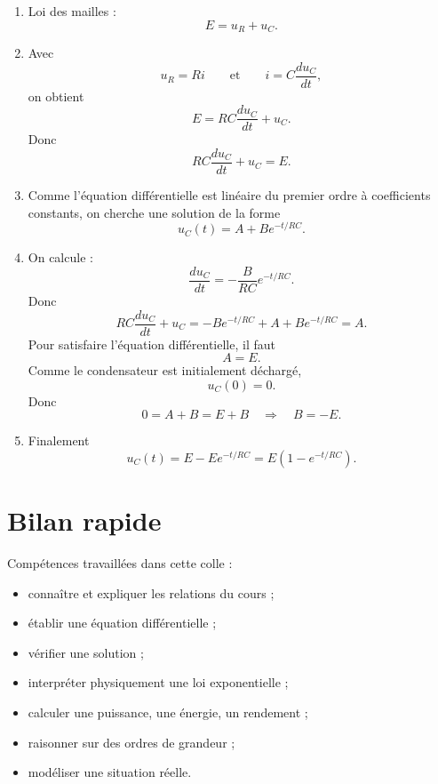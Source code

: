 \documentclass[11pt,a4paper]{article}
\begin{document}
\begin{corrigebox}
\begin{enumerate}[label=\alph*)]
    \item Loi des mailles :
    \[
    E=u_R+u_C.
    \]

    \item Avec
    \[
    u_R=Ri
    \qquad \text{et} \qquad
    i=C\frac{du_C}{dt},
    \]
    on obtient
    \[
    E=RC\frac{du_C}{dt}+u_C.
    \]
    Donc
    \[
    RC\frac{du_C}{dt}+u_C=E.
    \]

    \item Comme l'équation différentielle est linéaire du premier ordre à coefficients constants, on cherche une solution de la forme
    \[
    u_C(t)=A+Be^{-t/RC}.
    \]

    \item On calcule :
    \[
    \frac{du_C}{dt}=-\frac{B}{RC}e^{-t/RC}.
    \]
    Donc
    \[
    RC\frac{du_C}{dt}+u_C
    =
    -Be^{-t/RC}+A+Be^{-t/RC}=A.
    \]
    Pour satisfaire l'équation différentielle, il faut
    \[
    A=E.
    \]
    Comme le condensateur est initialement déchargé,
    \[
    u_C(0)=0.
    \]
    Donc
    \[
    0=A+B=E+B
    \quad \Rightarrow \quad
    B=-E.
    \]

    \item Finalement
    \[
    u_C(t)=E-Ee^{-t/RC}
    =E\left(1-e^{-t/RC}\right).
    \]
\end{enumerate}
\end{corrigebox}

\section{Bilan rapide}

\begin{importantbox}
Compétences travaillées dans cette colle :
\begin{itemize}
    \item connaître et expliquer les relations du cours ;
    \item établir une équation différentielle ;
    \item vérifier une solution ;
    \item interpréter physiquement une loi exponentielle ;
    \item calculer une puissance, une énergie, un rendement ;
    \item raisonner sur des ordres de grandeur ;
    \item modéliser une situation réelle.
\end{itemize}
\end{importantbox}
\end{document}
